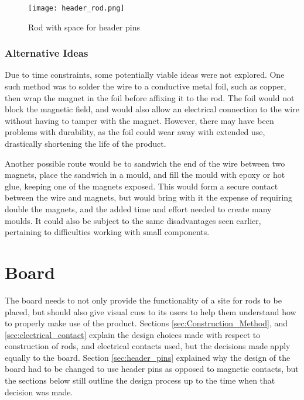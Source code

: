 \begin{figure}[H]
	\begin{center}
	\texttt{[image: header\_rod.png]}\\ 
  	\caption{Rod with space for header pins}
    \label{fig:header_rod}
    \end{center}
\end{figure}

\subsubsection{Alternative Ideas}
Due to time constraints, some potentially viable ideas were not explored. One such method was to solder the wire to a conductive metal foil, such as copper, then wrap the magnet in the foil before affixing it to the rod. The foil would not block the magnetic field, and would also allow an electrical connection to the wire without having to tamper with the magnet. However, there may have been problems with durability, as the foil could wear away with extended use, drastically shortening the life of the product. 

Another possible route would be to sandwich the end of the wire between two magnets, place the sandwich in a mould, and fill the mould with epoxy or hot glue, keeping one of the magnets exposed. This would form a secure contact between the wire and magnets, but would bring with it the expense of requiring double the magnets, and the added time and effort needed to create many moulds. It could also be subject to the same disadvantages seen earlier, pertaining to difficulties working with small components.


    
    
\section{Board}
\label{sec:board}

The board needs to not only provide the functionality of a site for rods to be placed, but should also give visual cues to its users to help them understand how to properly make use of the product. Sections \ref{sec:Construction_Method}, and \ref{sec:electrical_contact} explain the design choices made with respect to construction of rods, and electrical contacts used, but the decisions made apply equally to the board. Section \ref{sec:header_pins} explained why the design of the board had to be changed to use header pins as opposed to magnetic contacts, but the sections below still outline the design process up to the time when that decision was made. 



